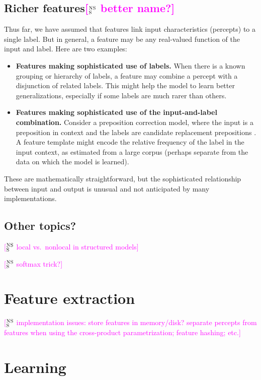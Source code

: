 \documentclass[11pt,letterpaper]{article}
\newcommand{\ensuretext}[1]{#1}
\newcommand{\nssmarker}{\ensuretext{\textcolor{magenta}{\ensuremath{^{\textsc{NS}}_{\textsc{S}}}}}}
\newcommand{\arkcomment}[3]{\ensuretext{\textcolor{#3}{[#1 #2]}}}
\newcommand{\nss}[1]{\arkcomment{\nssmarker}{#1}{magenta}}
\begin{document}
\subsection{Richer features\nss{better name?}}\label{sec:richer}

Thus far, we have assumed that features link input characteristics (percepts) 
to a single label. But in general, a feature may be any real-valued function of the input and label.
Here are two examples:

\begin{itemize}
\item \textbf{Features making sophisticated use of labels.} 
When there is a known grouping or hierarchy of labels, a feature may combine a percept 
with a disjunction of related labels. This might help the model to learn better generalizations, 
especially if some labels are much rarer than others.

\item \textbf{Features making sophisticated use of the input-and-label combination.}
Consider a preposition correction model, where the input is a preposition in context 
and the labels are candidate replacement prepositions \citep[as in][]{han-10}. 
A feature template might encode the relative frequency of the label in the input context, 
as estimated from a large corpus (perhaps separate from the data on which the model is learned).
\end{itemize}

These are mathematically straightforward, but the sophisticated relationship between input and output 
is unusual and not anticipated by many implementations.

\subsection{Other topics?}

\nss{local vs.~nonlocal in structured models}

\nss{softmax trick?}

\section{Feature extraction}\label{sec:extraction}

\nss{implementation issues: store features in memory/disk? separate percepts from features when using the cross-product parametrization; 
feature hashing; etc.}


\section{Learning}\label{sec:learning}
\end{document}

